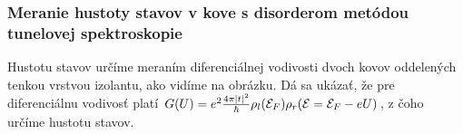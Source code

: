 \documentclass[
	11pt, %
]{beamer}
\begin{document}
\begin{frame}
\frametitle{Meranie hustoty stavov v kove s disorderom metódou tunelovej spektroskopie}
\vspace{-15mm}
\begin{figure}%
    \centering
    \vspace{-10mm}
    \label{fig:example}%
\end{figure}
\small
Hustotu stavov určíme meraním diferenciálnej vodivosti dvoch kovov oddelených tenkou vrstvou izolantu, ako vidíme na obrázku. 
Dá sa ukázať, že pre diferenciálnu vodivosť platí
$G(U)=e^2\frac{4\pi|t|^2}{\hbar}\rho_l(\mathcal{E}_F)\rho_r(\mathcal{E}=\mathcal{E}_F-eU)$, z čoho určíme hustotu stavov. 
\normalsize
\end{frame}
\end{document}
